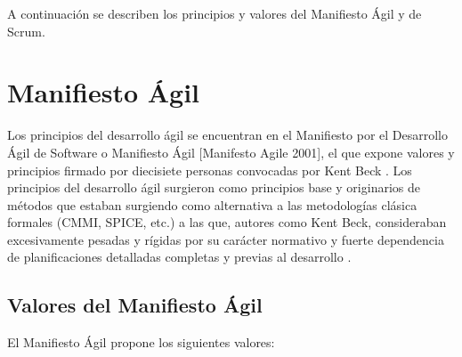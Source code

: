 A continuación se describen los principios y valores del Manifiesto Ágil y de Scrum.

\section{Manifiesto Ágil}

Los principios del desarrollo ágil se encuentran en el Manifiesto por el Desarrollo Ágil de Software o Manifiesto Ágil [Manifesto Agile 2001], el que expone valores y principios firmado por diecisiete personas convocadas por Kent Beck \cite{Beck-2001}. Los principios del desarrollo ágil surgieron como principios base y originarios de métodos que estaban surgiendo como alternativa a las metodologías clásica formales (CMMI, SPICE, etc.) a las que, autores como Kent Beck, consideraban excesivamente pesadas y rígidas por su carácter normativo y fuerte dependencia de planificaciones detalladas completas y previas al desarrollo \cite{Wiki-2015}.

\subsection{Valores del Manifiesto Ágil}

El Manifiesto Ágil propone los siguientes valores:

